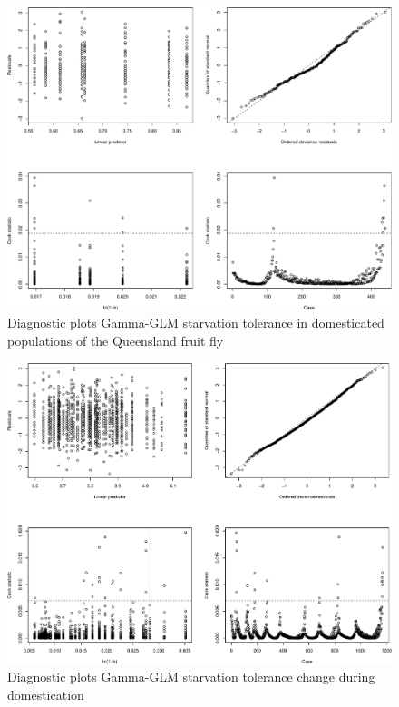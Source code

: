 \documentclass[]{article}
\begin{document}
\begin{figure}

{\centering \includegraphics{Supplementary_files/figure-latex/Diagnostic plots starvation tolerance in domesticated flies-1} 

}

\caption{Diagnostic plots Gamma-GLM starvation tolerance in domesticated populations of the Queensland fruit fly}\label{fig:Diagnostic plots starvation tolerance in domesticated flies}
\end{figure}

\begin{figure}

{\centering \includegraphics{Supplementary_files/figure-latex/Diagnostic plots starvation change during domestication-1} 

}

\caption{Diagnostic plots Gamma-GLM starvation tolerance change during domestication}\label{fig:Diagnostic plots starvation change during domestication}
\end{figure}
\end{document}
